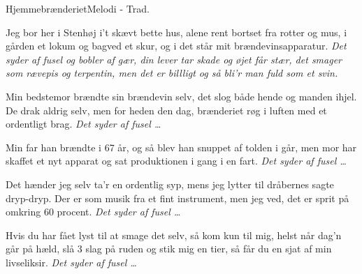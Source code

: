 \begin{sang}{Hjemmebrænderiet}{Melodi - Trad.}
\begin{vers}
Jeg bor her i Stenhøj i't skævt bette hus,
alene rent bortset fra rotter og mus,
i gården et lokum og bagved et skur,
og i det står mit brændevinsapparatur.
{\em Det syder af fusel og bobler af gær,
din lever tar skade og øjet får stær,
det smager som rævepis og terpentin,
men det er billligt og så bli'r man fuld som et svin.}
\end{vers}
\begin{vers}
Min bedstemor brændte sin brændevin selv,
det slog både hende og manden ihjel. 
De drak aldrig selv, men for heden den dag,
brænderiet røg i luften med et ordentligt brag.
{\em Det syder af fusel \ldots}
\end{vers}
\vfill
\begin{vers}
Min far han brændte i 67 år, 
og så blev han snuppet af tolden i går,
men mor har skaffet et nyt apparat   
og sat produktionen i gang i en fart.
{\em Det syder af fusel \ldots}
\end{vers}
\begin{vers}
Det hænder jeg selv ta'r en ordentlig syp,
mens jeg lytter til dråbernes sagte dryp-dryp.
Der er som musik fra et fint instrument,
men jeg ved, det er sprit på omkring 60 procent.
{\em Det syder af fusel \ldots}
\end{vers}
\begin{vers}
Hvis du har fået lyst til at smage det selv,
så kom kun til mig, helst når dag'n går på hæld,
slå 3 slag på ruden og stik mig en tier,
så får du en sjat af min livseliksir.
{\em Det syder af fusel \ldots}
\end{vers}
\laps
\end{sang}